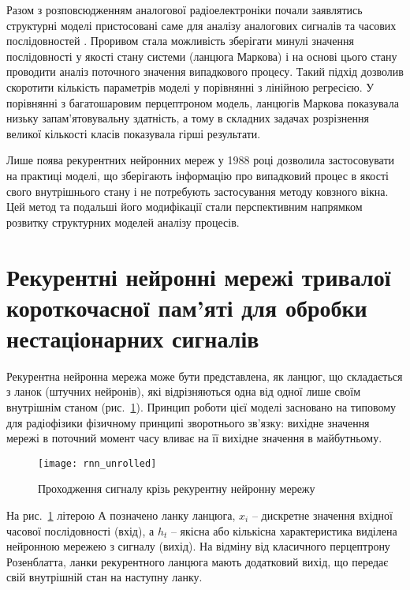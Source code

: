 Разом з розповсюдженням аналогової радіоелектроніки почали заявлятись 
структурні моделі пристосовані саме для аналізу аналогових сигналів 
та часових послідовностей \cite{imp:Markov1906}. Проривом стала можливість
зберігати минулі значення послідовності у якості стану системи 
(ланцюга Маркова) і на основі цього стану проводити аналіз поточного 
значення випадкового процесу. Такий підхід дозволив скоротити кількість 
параметрів моделі у порівнянні з лінійною регресією. У порівнянні з 
багатошаровим перцептроном модель, ланцюгів Маркова показувала низьку 
запам'ятовувальну здатність, а тому в складних задачах розрізнення великої 
кількості класів показувала гірші результати.

Лише поява рекурентних нейронних мереж у 1988 році \cite{imp:Rumelhart1988} 
дозволила застосовувати на практиці моделі, що зберігають інформацію про 
випадковий процес в якості свого внутрішнього стану і не потребують 
застосування методу ковзного вікна. Цей метод та подальші його модифікації
стали перспективним напрямком розвитку структурних моделей аналізу процесів. 


\section{Рекурентні нейронні мережі тривалої короткочасної пам'яті для 
обробки нестаціонарних сигналів}

Рекурентна нейронна мережа може бути представлена, як ланцюг, що складається
з ланок (штучних нейронів), які відрізняються одна від одної лише своїм 
внутрішнім станом (рис.~\ref{fig:rnn_unrolled}). Принцип роботи цієї моделі 
засновано на типовому для радіофізики фізичному принципі зворотнього зв'язку:
вихідне значення мережі в поточний момент часу вливає на її вихідне значення 
в майбутньому.

\begin{figure}[htbp] \begin{center}
\texttt{[image: rnn\_unrolled]}
\caption{Проходження сигналу крізь рекурентну нейронну мережу}
\label{fig:rnn_unrolled}
\end{center} \end{figure}

На рис.~\ref{fig:rnn_unrolled} літерою А позначено ланку ланцюга, $ x_i $ --
дискретне значення вхідної часової послідовності (вхід), а $ h_t $ -- якісна 
або кількісна характеристика виділена нейронною мережею з сигналу (вихід). 
На відміну від класичного перцептрону Розенблатта, ланки рекурентного ланцюга 
мають додатковий вихід, що передає свій внутрішній стан на наступну ланку.

